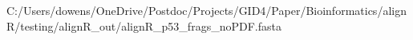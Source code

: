 \documentclass[preview]{standalone}
\begin{document}
\begin{texshade}{C:/Users/dowens/OneDrive/Postdoc/Projects/GID4/Paper/Bioinformatics/alignR/testing/alignR_out/alignR_p53_frags_noPDF.fasta}
\showlegend
\movelegend{0cm}{0cm}
\namesfootnotesize
\residuesfootnotesize
\legendfootnotesize
\numberingtiny
\end{texshade}
\end{document}

